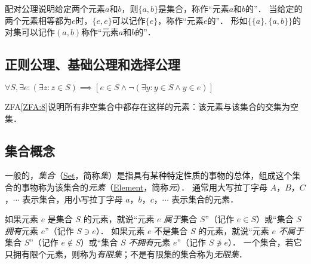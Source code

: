配对公理说明给定两个元素$a$和$b$，则$ \{ a, b \} $是集合，称作``元素$a$和$b$的''．
当给定的两个元素相等都为$e$时，$ \{ e, e \} $可以记作$ \{ e \} $，称作``元素$e$的''．
形如$ \{ \{ a \}, \{ a, b \} \} $的对集可以记作$ (a, b) $称作``元素$a$和$b$的''．

\begin{ZermeloFraenkelAxioms}[并集公理]\label{ZFA:4}
\end{ZermeloFraenkelAxioms}

\begin{ZermeloFraenkelAxioms}[幂集公理]\label{ZFA:5}
\end{ZermeloFraenkelAxioms}

\begin{ZermeloFraenkelAxioms}[无穷公理]\label{ZFA:6}
\end{ZermeloFraenkelAxioms}

\begin{ZermeloFraenkelAxioms}[替换公理]\label{ZFA:7}
\end{ZermeloFraenkelAxioms}

\subsection{正则公理、基础公理和选择公理}

\begin{ZermeloFraenkelAxioms}[正则公理]\label{ZFA:8}
    $ \forall S, \exists e: (\exists z: z \in S) \implies [e \in S \land \lnot(\exists y: y \in S \land y \in e)] $
\end{ZermeloFraenkelAxioms}
ZFA\ref{ZFA:8}说明所有非空集合中都存在这样的元素：该元素与该集合的交集为空集．


\subsection{集合概念}

一般的，\emph{集合}（\href{http://mathworld.wolfram.com/Set.html}{Set}，简称\emph{集}）是指具有某种特定性质的事物的总体，组成这个集合的事物称为该集合的\emph{元素}（\href{http://mathworld.wolfram.com/Element.html}{Element}，简称\emph{元}）．
通常用大写拉丁字母 $A$，$B$，$C$，$\cdots$ 表示集合，用小写拉丁字母 $a$，$b$，$c$，$\cdots$ 表示集合的元素．

如果元素 $e$ 是集合 $S$ 的元素，就说``元素 $e$ \emph{属于}集合 $S$''（记作 $e\in{}S$）或``集合 $S$ \emph{拥有}元素 $e$''（记作 $S\ni{}e$）．
如果元素 $e$ 不是集合 $S$ 的元素，就说``元素 $e$ \emph{不属于}集合 $S$''（记作 $e\not\in{}S$）或``集合 $S$ \emph{不拥有}元素 $e$''（记作 $S\not\ni{}e$）．
一个集合，若它只拥有限个元素，则称为\emph{有限集}；不是有限集的集合称为\emph{无限集}．

